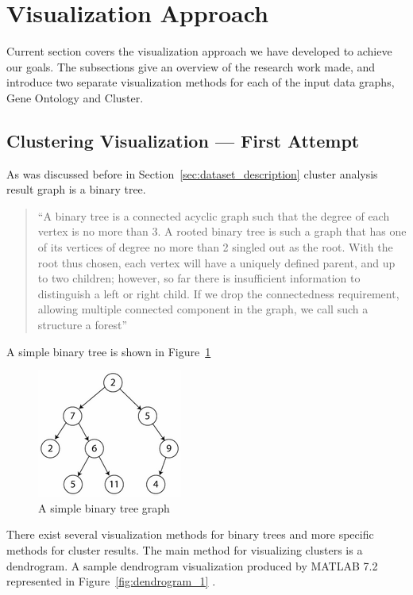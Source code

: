 \newpage
\section{Visualization Approach}
\label{sec:solution}

Current section covers the visualization approach we have developed to achieve our goals. The subsections give an overview of the research work made,
and introduce two separate visualization methods for each of the input data graphs, Gene Ontology and Cluster.


\subsection{Clustering Visualization --- First Attempt}
\label{sec:probe}

As was discussed before in Section~\ref{sec:dataset_description} cluster analysis result graph is a binary tree.

\begin{quotation}
``A binary tree is a connected acyclic graph such that the degree of each vertex is no more than 3.
A rooted binary tree is such a graph that has one of its vertices of degree no more than 2 singled out as the root.
With the root thus chosen, each vertex will have a uniquely defined parent, and up to two children; however, so far there is insufficient information to distinguish a left or right child.
If we drop the connectedness requirement, allowing multiple connected component in the graph, we call such a structure a forest''~\cite{BINARY_TREE}
\end{quotation}

A simple binary tree is shown in Figure~\ref{fig:simple_binary_tree}

\begin{figure}[h!]
\centering
\includegraphics[scale=1.0]{pictures/simple_binary_tree.png}
\caption{A simple binary tree graph}
\label{fig:simple_binary_tree}
\end{figure}

There exist several visualization methods for binary trees and more specific methods for cluster results.
The main method for visualizing clusters is a dendrogram. A sample dendrogram visualization produced by MATLAB 7.2 represented in Figure~\ref{fig:dendrogram_1} .

